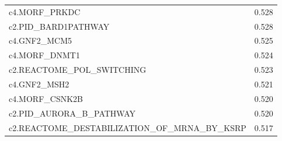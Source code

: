 \begin{table}[!htbp]
\begin{tabular}{@{}ll@{}}
c4.MORF\_PRKDC                                                                                                                                                                                                                          & 0.528          \\
c2.PID\_BARD1PATHWAY                                                                                                                                                                                                                    & 0.528          \\
c4.GNF2\_MCM5                                                                                                                                                                                                                           & 0.525          \\
c4.MORF\_DNMT1                                                                                                                                                                                                                          & 0.524          \\
c2.REACTOME\_POL\_SWITCHING                                                                                                                                                                                                             & 0.523          \\
c4.GNF2\_MSH2                                                                                                                                                                                                                           & 0.521          \\
c4.MORF\_CSNK2B                                                                                                                                                                                                                         & 0.520          \\
c2.PID\_AURORA\_B\_PATHWAY                                                                                                                                                                                                              & 0.520          \\
c2.REACTOME\_DESTABILIZATION\_OF\_MRNA\_BY\_KSRP                                                                                                                                                                                        & 0.517          \\

\end{tabular}
\end{table}
